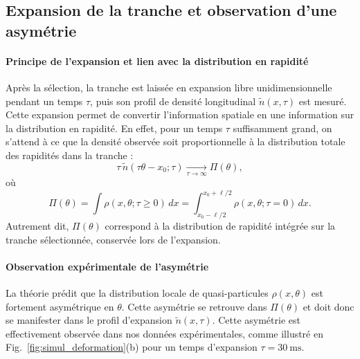\subsection{Expansion de la tranche et observation d’une asymétrie}

\paragraph{Principe de l’expansion et lien avec la distribution en rapidité}

Après la sélection, la tranche est laissée en expansion libre unidimensionnelle pendant un temps $\tau$, puis son profil de densité longitudinal $\tilde{n}(x,\tau)$ est mesuré. Cette expansion permet de convertir l’information spatiale en une information sur la distribution en rapidité. En effet, pour un temps $\tau$ suffisamment grand, on s’attend à ce que la densité observée soit proportionnelle à la distribution totale des rapidités dans la tranche :
\begin{equation}
\tau\, \tilde{n}(\tau \theta - x_0 ; \tau) \underset{\tau \to \infty}{\longrightarrow} \Pi(\theta),
\end{equation}
où
\begin{equation}
\Pi(\theta) = \int \rho(x, \theta ; \tau \geq 0)\, dx = \int_{x_0 - \ell/2}^{x_0 + \ell/2} \rho(x, \theta ; \tau = 0)\, dx.
\end{equation}
Autrement dit, $\Pi(\theta)$ correspond à la distribution de rapidité intégrée sur la tranche sélectionnée, conservée lors de l’expansion.

\paragraph{Observation expérimentale de l’asymétrie}

La théorie prédit que la distribution locale de quasi-particules $\rho(x,\theta)$ est fortement asymétrique en $\theta$. Cette asymétrie se retrouve dans $\Pi(\theta)$ et doit donc se manifester dans le profil d’expansion $\tilde{n}(x,\tau)$. Cette asymétrie est effectivement observée dans nos données expérimentales, comme illustré en Fig.~\ref{fig:simul_deformation}(b) pour un temps d’expansion $\tau = 30~\mathrm{ms}$. 



